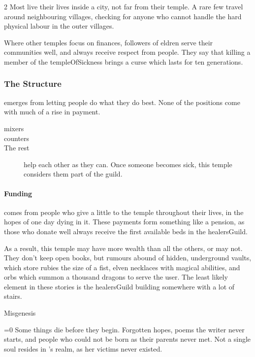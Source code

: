 \begin{multicols}{2}
Most live their lives inside a city, not far from their temple.
A rare few travel around neighbouring \glspl{village}, checking for anyone who cannot handle the hard physical labour in the outer \glspl{village}.

Where other temples focus on finances, followers of \gls{eldren} serve their communities well, and always receive respect from people.
They say that killing a member of the \gls{templeOfSickness} brings a curse which lasts for ten generations.

\subsubsection{The Structure}
emerges from letting people do what they do best.
None of the positions come with much of a rise in payment.

\begin{description}
  \item[\Glspl{mixer}]
  \item[\Glspl{counter}]
  \item[The rest]
  help each other as they can.
  Once someone becomes sick, this \gls{temple} considers them part of the guild.
\end{description}

\paragraph{Funding}
comes from people who give a little to the temple throughout their lives, in the hopes of one day dying in it.
These payments form something like a pension, as those who donate well always receive the first available beds in the \gls{healersGuild}.

As a result, this temple may have more wealth than all the others, or may not.
They don't keep open books, but rumours abound of hidden, underground vaults, which store rubies the size of a fist, elven necklaces with magical abilities, and orbs which summon a thousand dragons to serve the user.
The least likely element in these stories is the \gls{healersGuild} building somewhere with a lot of stairs.

  {Misgenesis}%
  {
  \ifnum\value{temperature}=0%
  \else%
  \fi%
  Some things die before they begin.
  Forgotten hopes, poems the writer never starts, and people who could not be born as their parents never met.
  Not a single soul resides in \hphantom{Nulla}'s realm, as her victims never existed.

}
\end{multicols}
